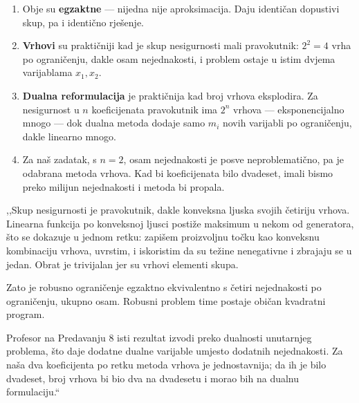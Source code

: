 \begin{korak}
\begin{enumerate}[leftmargin=*]
  \item Obje su \textbf{egzaktne} --- nijedna nije aproksimacija. Daju identičan
        dopustivi skup, pa i identično rješenje.
  \item \textbf{Vrhovi} su praktičniji kad je skup nesigurnosti mali pravokutnik:
        $2^2 = 4$ vrha po ograničenju, dakle osam nejednakosti, i problem ostaje
        u istim dvjema varijablama $x_1, x_2$.
  \item \textbf{Dualna reformulacija} je praktičnija kad broj vrhova eksplodira.
        Za nesigurnost u $n$ koeficijenata pravokutnik ima $2^n$ vrhova ---
        eksponencijalno mnogo --- dok dualna metoda dodaje samo $m_i$ novih
        varijabli po ograničenju, dakle linearno mnogo.
  \item Za naš zadatak, s $n = 2$, osam nejednakosti je posve neproblematično, pa
        je odabrana metoda vrhova. Kad bi koeficijenata bilo dvadeset, imali
        bismo preko milijun nejednakosti i metoda bi propala.
\end{enumerate}
\end{korak}

\begin{izgovor}
,,Skup nesigurnosti je pravokutnik, dakle konveksna ljuska svojih četiriju
vrhova. Linearna funkcija po konveksnoj ljusci postiže maksimum u nekom od
generatora, što se dokazuje u jednom retku: zapišem proizvoljnu točku kao
konveksnu kombinaciju vrhova, uvrstim, i iskoristim da su težine nenegativne i
zbrajaju se u jedan. Obrat je trivijalan jer su vrhovi elementi skupa.

Zato je robusno ograničenje egzaktno ekvivalentno s četiri nejednakosti po
ograničenju, ukupno osam. Robusni problem time postaje običan kvadratni program.

Profesor na Predavanju 8 isti rezultat izvodi preko dualnosti unutarnjeg
problema, što daje dodatne dualne varijable umjesto dodatnih nejednakosti. Za
naša dva koeficijenta po retku metoda vrhova je jednostavnija; da ih je bilo
dvadeset, broj vrhova bi bio dva na dvadesetu i morao bih na dualnu formulaciju.``
\end{izgovor}
